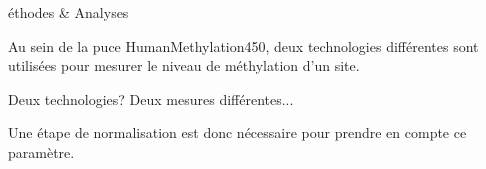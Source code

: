 \begin{frame}[allowframebreaks]{éthodes \& Analyses}
\par{Au sein de la puce HumanMethylation450, deux technologies différentes sont utilisées pour mesurer le niveau de méthylation d'un site.}
\begin{minipage}[t]{0.475\columnwidth}
    \vspace{0.2cm}
    \begin{center}
    \end{center}
\end{minipage}%
\hfill
\begin{minipage}[t]{0.475\columnwidth}
    \vspace{0.5cm}
    \begin{center}
    \end{center}
\end{minipage}%
\framebreak
\par{Deux technologies? Deux mesures différentes...}
\par{Une étape de normalisation est donc nécessaire pour prendre en compte ce paramètre.}
\begin{center}

\end{center}
\end{frame}
